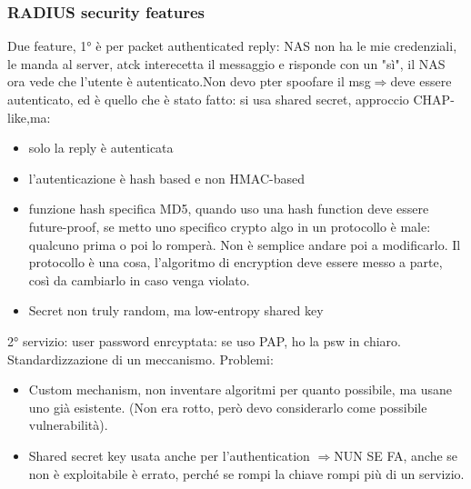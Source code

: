 \documentclass[16px]{article}
\begin{document}
\subsubsection{RADIUS security features}
Due feature, 1° è
per packet authenticated reply: NAS non ha le mie credenziali, le manda al server, atck interecetta il messaggio e risponde con un "sì", il NAS ora vede che l'utente è autenticato.Non devo pter spoofare il msg$\Rightarrow$deve essere autenticato, ed è quello che è stato fatto: si usa shared secret, approccio CHAP-like,ma:
\begin{itemize}
\item solo la reply è autenticata
\item l'autenticazione è hash based e non HMAC-based
\item funzione hash specifica MD5, quando uso una hash function deve essere future-proof, se metto uno specifico crypto algo in un protocollo è male: qualcuno prima o poi lo romperà. Non è semplice andare poi a modificarlo. Il protocollo è una cosa, l'algoritmo di encryption deve essere messo a parte, così da cambiarlo in caso venga violato.
\item Secret non truly random, ma low-entropy shared key
\end{itemize}
2° servizio: user password enrcyptata: se uso PAP, ho la psw in chiaro. Standardizzazione di un meccanismo. Problemi:
\begin{itemize}
\item Custom mechanism, non inventare algoritmi per quanto possibile, ma usane uno già esistente. (Non era rotto, però devo considerarlo come possibile vulnerabilità).
\item Shared secret key usata anche per l'authentication $\Rightarrow$NUN SE FA, anche se non è exploitabile è errato, perché se rompi la chiave rompi più di un servizio.
\end{itemize}
\end{document}
